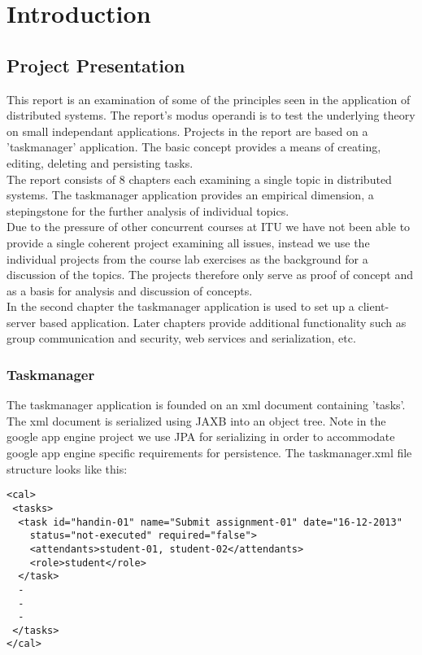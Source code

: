 \chapter{Introduction}
\minitoc

\section{Project Presentation}

This report is an examination of some of the principles seen in the application of distributed systems. The report's modus operandi is to test the underlying theory on small independant applications. Projects in the report are based on a 'taskmanager' application. The basic concept provides a means of creating, editing, deleting and persisting tasks. \\

The report consists of 8 chapters each examining a single topic in distributed systems. The taskmanager application provides an empirical dimension, a stepingstone for the further analysis of individual topics. \\

Due to the pressure of other concurrent courses at ITU we have not been able to provide a single coherent project examining all issues, instead we use the individual projects from the course lab exercises as the background for a discussion of the topics. The projects therefore only serve as proof of concept and as a basis for analysis and discussion of concepts.  \\

In the second chapter the taskmanager application is used to set up a client-server based application. Later chapters provide additional functionality such as group communication and security, web services and serialization, etc. \\

\begin{comment}
The idea is to try out some of the techniques commonly seen in the implementation of distributed systems and thereby demonstrate our understanding of the theories behind, as well as (some of), the challenges faced by distributed systems. 
\end{comment}

\subsection{Taskmanager}

The taskmanager application is founded on an xml document containing 'tasks'. The xml document is serialized using JAXB into an object tree. Note in the google app engine project we use JPA for serializing in order to accommodate google app engine specific requirements for persistence. The taskmanager.xml file structure looks like this:
\pagebreak
\begin{lstlisting}[caption = taskmanager.xml]
<cal>
 <tasks>
  <task id="handin-01" name="Submit assignment-01" date="16-12-2013"
	status="not-executed" required="false">
	<attendants>student-01, student-02</attendants>
	<role>student</role>	
  </task>
  - 
  - 
  - 
 </tasks>
</cal>
\end{lstlisting}

